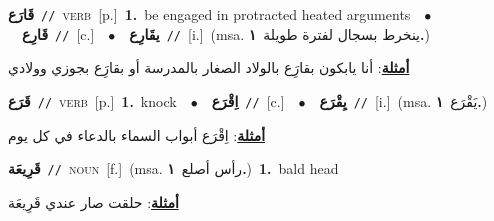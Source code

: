 \documentclass[10pt,a4paper,twoside]{article} %
\begin{document}
\begin{multicols}{2}
{\setlength\topsep{0pt}\textbf{\foreignlanguage{arabic}{قَارَع}}\ {\color{gray}\texttt{//}\color{black}}\ \textsc{verb}\ [p.]\ \textbf{1.}~be engaged in protracted heated arguments\ \ $\bullet$\ \ \setlength\topsep{0pt}\textbf{\foreignlanguage{arabic}{قَارِع}}\ {\color{gray}\texttt{//}\color{black}}\ [c.]\ \ $\bullet$\ \ \setlength\topsep{0pt}\textbf{\foreignlanguage{arabic}{يقَارِع}}\ {\color{gray}\texttt{//}\color{black}}\ [i.]\ \color{gray}(msa. \foreignlanguage{arabic}{ينخرط بسجال لفترة طويلة}~\foreignlanguage{arabic}{\textbf{١.}})\color{black}\  \begin{flushright}\color{gray}\foreignlanguage{arabic}{\textbf{\underline{\foreignlanguage{arabic}{أمثلة}}}: أنا يابكون بقارَِع بالولاد الصغار بالمدرسة أو بقارَِع بجوزي وولادي}\end{flushright}\color{black}} \vspace{2mm}

{\setlength\topsep{0pt}\textbf{\foreignlanguage{arabic}{قَرَع}}\ {\color{gray}\texttt{//}\color{black}}\ \textsc{verb}\ [p.]\ \textbf{1.}~knock\ \ $\bullet$\ \ \setlength\topsep{0pt}\textbf{\foreignlanguage{arabic}{اِقْرَع}}\ {\color{gray}\texttt{//}\color{black}}\ [c.]\ \ $\bullet$\ \ \setlength\topsep{0pt}\textbf{\foreignlanguage{arabic}{يِقْرَع}}\ {\color{gray}\texttt{//}\color{black}}\ [i.]\ \color{gray}(msa. \foreignlanguage{arabic}{يَقْرَع}~\foreignlanguage{arabic}{\textbf{١.}})\color{black}\  \begin{flushright}\color{gray}\foreignlanguage{arabic}{\textbf{\underline{\foreignlanguage{arabic}{أمثلة}}}: اِقْرَع أبواب السماء بالدعاء في كل يوم}\end{flushright}\color{black}} \vspace{2mm}

{\setlength\topsep{0pt}\textbf{\foreignlanguage{arabic}{قَرِيعَة}}\ {\color{gray}\texttt{//}\color{black}}\ \textsc{noun}\ [f.]\ \color{gray}(msa. \foreignlanguage{arabic}{رأس أصلع}~\foreignlanguage{arabic}{\textbf{١.}})\color{black}\ \textbf{1.}~bald head\  \begin{flushright}\color{gray}\foreignlanguage{arabic}{\textbf{\underline{\foreignlanguage{arabic}{أمثلة}}}: حلقت صار عندي قَرِيعَة}\end{flushright}\color{black}} \vspace{2mm}


\end{multicols}
\end{document}
